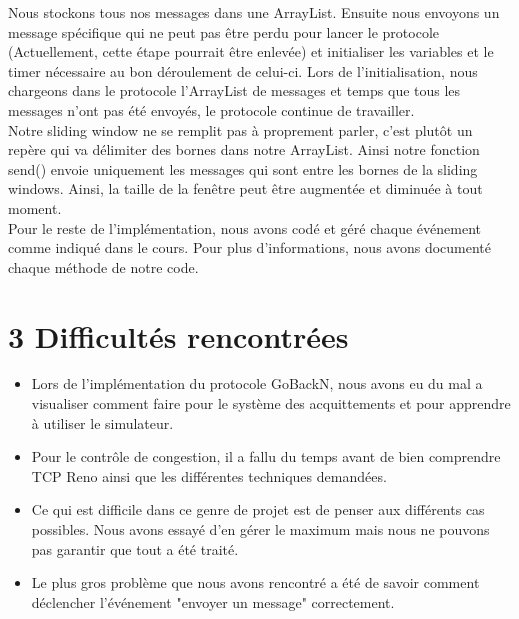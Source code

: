 \documentclass{report}
\begin{document}
Nous stockons tous nos messages dans une ArrayList. Ensuite nous envoyons un message spécifique qui ne peut pas être perdu pour lancer le protocole (Actuellement, cette étape pourrait être enlevée) et 
initialiser les variables et le timer nécessaire au bon déroulement de celui-ci. Lors de l'initialisation, nous chargeons dans le protocole l'ArrayList de messages et temps que tous les messages 
n'ont pas été envoyés, le protocole continue de travailler.\\

Notre sliding window ne se remplit pas à proprement parler, c'est plutôt un repère qui va délimiter des bornes dans notre ArrayList. Ainsi notre fonction send() envoie uniquement les messages 
qui sont entre les bornes de la sliding windows. Ainsi, la taille de la fenêtre peut être augmentée et diminuée à tout moment.\\

Pour le reste de l'implémentation, nous avons codé et géré chaque événement comme indiqué dans le cours. Pour plus d'informations, nous avons documenté chaque méthode de notre code.



\section*{3 Difficultés rencontrées}
\begin{itemize}
\item Lors de l'implémentation du protocole GoBackN, nous avons eu du mal a visualiser comment faire pour le système des acquittements et pour apprendre à utiliser le simulateur.
\item Pour le contrôle de congestion, il a fallu du temps avant de bien comprendre TCP Reno ainsi que les différentes techniques demandées.
\item Ce qui est difficile dans ce genre de projet est de penser aux différents cas possibles. Nous avons essayé d'en gérer le maximum mais nous ne pouvons pas garantir que tout a été traité.
\item Le plus gros problème que nous avons rencontré a été de savoir comment déclencher l’événement "envoyer un message" correctement.
\end{itemize}
\end{document}
